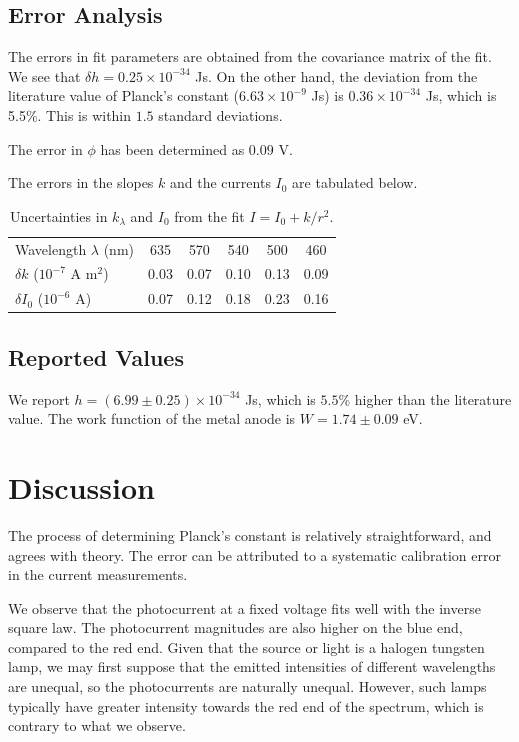 \documentclass[11pt]{article}
\begin{document}
        \subsection{Error Analysis}
        The errors in fit parameters are obtained from the covariance matrix of the fit. We see that $\delta h = 0.25 \times 10^{-34}$ Js.
        On the other hand, the deviation from the literature value of Planck's constant ($6.63 \times 10^{-9}$ Js) is
        $0.36 \times 10^{-34}$ Js, which is 5.5\%. This is within $1.5$ standard deviations.

        The error in $\phi$ has been determined as $0.09$ V.
        
        The errors in the slopes $k$ and the currents $I_0$ are tabulated below.
        \begin{table}[H]
        \caption{Uncertainties in $k_\lambda$ and $I_0$ from the fit $I = I_0 + k /r^2$.}
        \centering
        \begin{tabular}{l|ccccc}
                Wavelength $\lambda$ (nm)       & 635  & 570  & 540  & 500  & 460  \\
                $\delta k$ ($10^{-7}$ A m$^2$)  & 0.03 & 0.07 & 0.10 & 0.13 & 0.09 \\
                $\delta I_0$ ($10^{-6}$ A)      & 0.07 & 0.12 & 0.18 & 0.23 & 0.16
        \end{tabular}
        \label{tab:slope_err}
        \end{table}

        \subsection{Reported Values}
        We report $h = (6.99 \pm 0.25) \times 10^{-34}$ Js, which is $5.5$\% higher than the literature value.
        The work function of the metal anode is $W = 1.74 \pm 0.09$ eV.

        \section{Discussion}
        The process of determining Planck's constant is relatively straightforward, and agrees with theory. The error can be attributed to 
        a systematic calibration error in the current measurements.

        We observe that the photocurrent at a fixed voltage fits well with the inverse square law.
        The photocurrent magnitudes are also higher on the blue end, compared to the red end.
        Given that the source or light is a halogen tungsten lamp, we may first suppose that the emitted intensities of different wavelengths
        are unequal, so the photocurrents are naturally unequal. However, such lamps typically have greater intensity towards the red end of the
        spectrum, which is contrary to what we observe.
\end{document}
